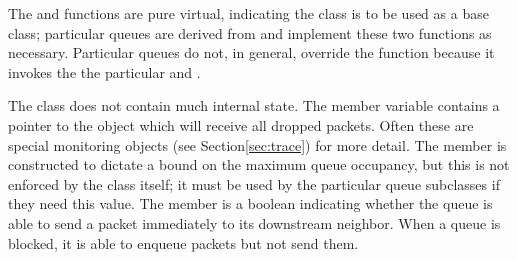 The  and  functions are pure virtual, indicating
the  class is to be used as a base class;
particular queues are derived
from  and implement these two functions as necessary.
Particular queues do not, in general, override the  function
because it invokes the
the particular  and .

The  class does not contain much internal state.
The  member variable contains a pointer to the object
which will receive all dropped packets.
Often these are special monitoring objects (see Section\ref{sec:trace})
for more detail.
The  member is constructed to dictate a bound on the maximum
queue occupancy, but this is not enforced by the  class itself; it
must be used by the particular queue subclasses if they need this value.
The  member is a boolean indicating whether the
queue is able to send a packet immediately to its downstream neighbor.
When a queue is blocked, it is able to enqueue packets but not send them.

\subsubsection{}

